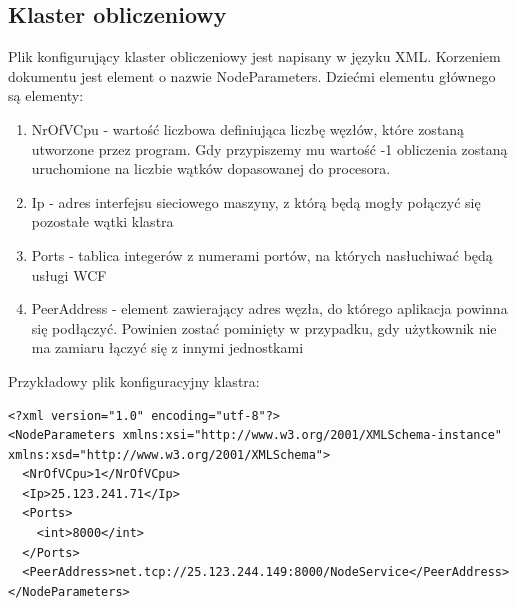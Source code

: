 \documentclass[12pt, twoside, openany, abstract=on]{report}
\theoremstyle{definition}
\begin{document}
\subsection{Klaster obliczeniowy}
Plik konfigurujący klaster obliczeniowy jest napisany w języku XML. Korzeniem dokumentu jest element o nazwie NodeParameters. 
Dziećmi elementu głównego są elementy:
\begin{enumerate}
	\item NrOfVCpu - wartość liczbowa definiująca liczbę węzłów, które zostaną utworzone przez program. Gdy przypiszemy mu wartość -1 obliczenia zostaną uruchomione na liczbie wątków dopasowanej do procesora.
	\item Ip - adres interfejsu sieciowego maszyny, z którą będą mogły połączyć się pozostałe wątki klastra
	\item Ports - tablica integerów z numerami portów, na których nasłuchiwać będą usługi WCF
	\item PeerAddress - element zawierający adres węzła, do którego aplikacja powinna się podłączyć. Powinien zostać pominięty w przypadku, gdy użytkownik nie ma zamiaru łączyć się z innymi jednostkami
\end{enumerate}
Przykładowy plik konfiguracyjny klastra:
\lstset{language=XML}
\begin{lstlisting}[frame=single]
<?xml version="1.0" encoding="utf-8"?>
<NodeParameters xmlns:xsi="http://www.w3.org/2001/XMLSchema-instance" xmlns:xsd="http://www.w3.org/2001/XMLSchema">
  <NrOfVCpu>1</NrOfVCpu>
  <Ip>25.123.241.71</Ip>
  <Ports>
    <int>8000</int>
  </Ports>
  <PeerAddress>net.tcp://25.123.244.149:8000/NodeService</PeerAddress>
</NodeParameters>
\end{lstlisting}
\end{document}
